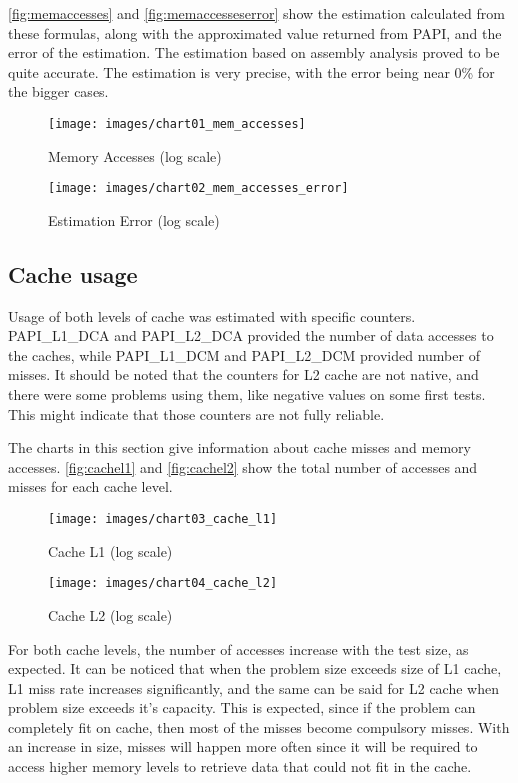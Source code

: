 \documentclass[twocolumn,10pt]{scrartcl}
\begin{document}
\autoref{fig:memaccesses} and \autoref{fig:memaccesseserror} show the estimation calculated from these formulas, along with the approximated value returned from PAPI, and the error of the estimation. The estimation based on assembly analysis proved to be quite accurate. The estimation is very precise, with the error being near 0\% for the bigger cases.

\begin{figure}[!htp]
	\texttt{[image: images/chart01\_mem\_accesses]}
	\caption{Memory Accesses (log scale) \label{fig:memaccesses}}
\end{figure}
\begin{figure}[!htp]
	\texttt{[image: images/chart02\_mem\_accesses\_error]}
	\caption{Estimation Error (log scale) \label{fig:memaccesseserror}}
\end{figure}

\subsection{Cache usage}

Usage of both levels of cache was estimated with specific counters. PAPI\_L1\_DCA and PAPI\_L2\_DCA provided the number of data accesses to the caches, while PAPI\_L1\_DCM and PAPI\_L2\_DCM provided number of misses. It should be noted that the counters for L2 cache are not native, and there were some problems using them, like negative values on some first tests. This might indicate that those counters are not fully reliable.

The charts in this section give information about cache misses and memory accesses. \autoref{fig:cachel1} and \autoref{fig:cachel2} show the total number of accesses and misses for each cache level.

\begin{figure}[!htp]
	\texttt{[image: images/chart03\_cache\_l1]}
	\caption{Cache L1 (log scale) \label{fig:cachel1}}
\end{figure}
\begin{figure}[!htp]
	\texttt{[image: images/chart04\_cache\_l2]}
	\caption{Cache L2 (log scale) \label{fig:cachel2}}
\end{figure}

For both cache levels, the number of accesses increase with the test size, as expected. It can be noticed that when the problem size exceeds size of L1 cache, L1 miss rate increases significantly, and the same can be said for L2 cache when problem size exceeds it's capacity. This is expected, since if the problem can completely fit on cache, then most of the misses become compulsory misses. With an increase in size, misses will happen more often since it will be required to access higher memory levels to retrieve data that could not fit in the cache.
\end{document}
